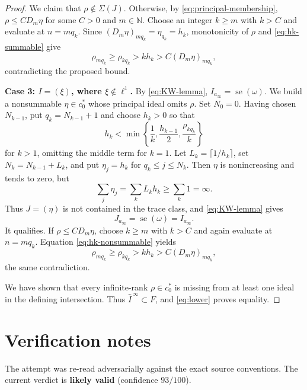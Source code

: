 \documentclass[11pt]{article}
\newcommand{\cstar}{c_0^*}
\newcommand{\ainf}{a_\infty}
\newcommand{\schar}{\Sigma}
\newcommand{\F}{F}
\newcommand{\se}{\operatorname{se}}
\begin{document}
\begin{proof}
We claim that $\rho\notin\schar(J)$.  Otherwise, by
\eqref{eq:principal-membership}, $\rho\le C D_m\eta$ for some $C>0$ and
$m\in\mathbb N$.  Choose an integer $k\ge m$ with $k>C$ and evaluate at
$n=mq_k$.  Since $(D_m\eta)_{mq_k}=\eta_{q_k}=h_k$, monotonicity of $\rho$
and \eqref{eq:hk-summable} give
\[
 \rho_{mq_k}\ge\rho_{kq_k}>kh_k
       >C(D_m\eta)_{mq_k},
\]
contradicting the proposed bound.

\smallskip
\noindent\textbf{Case 3: $I=(\xi)$, where $\xi\notin\ell^1$.}
By \eqref{eq:KW-lemma}, $I_{\ainf}=\se(\omega)$.  We build a nonsummable
$\eta\in\cstar$ whose principal ideal omits $\rho$.  Set $N_0=0$.  Having
chosen $N_{k-1}$, put $q_k=N_{k-1}+1$ and choose $h_k>0$ so that
\begin{equation}\label{eq:hk-nonsummable}
 h_k<\min\left\{\frac1k,\frac{h_{k-1}}2,
                      \frac{\rho_{kq_k}}k\right\}
\end{equation}
for $k>1$, omitting the middle term for $k=1$.  Let
$L_k=\lceil1/h_k\rceil$, set $N_k=N_{k-1}+L_k$, and put
$\eta_j=h_k$ for $q_k\le j\le N_k$.  Then $\eta$ is nonincreasing and tends
to zero, but
\[
 \sum_j\eta_j=\sum_k L_kh_k\ge\sum_k1=\infty.
\]
Thus $J=(\eta)$ is not contained in the trace class, and
\eqref{eq:KW-lemma} gives
\[
 J_{\ainf}=\se(\omega)=I_{\ainf}.
\]
It qualifies.  If $\rho\le C D_m\eta$, choose $k\ge m$ with $k>C$ and
again evaluate at $n=mq_k$.  Equation \eqref{eq:hk-nonsummable} yields
\[
 \rho_{mq_k}\ge\rho_{kq_k}>kh_k
       >C(D_m\eta)_{mq_k},
\]
the same contradiction.

We have shown that every infinite-rank $\rho\in\cstar$ is missing from at
least one ideal in the defining intersection.  Thus
$\widehat I^{\,\infty}\subset\F$, and \eqref{eq:lower} proves equality.
\end{proof}

\section{Verification notes}

The attempt was re-read adversarially against the exact source conventions.
The current verdict is \textbf{likely valid} (confidence $93/100$).
\end{document}
